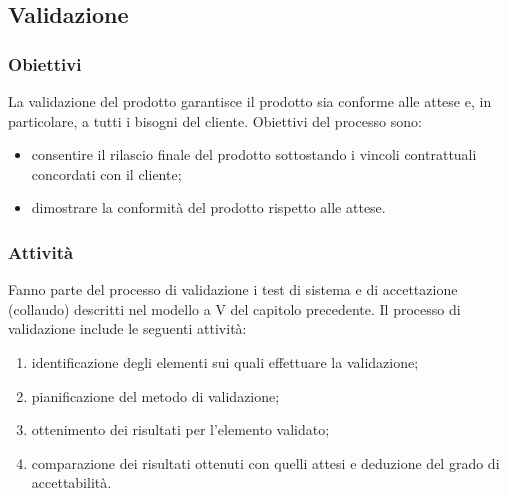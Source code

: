 \subsection{Validazione}
\subsubsection{Obiettivi}
La validazione del prodotto garantisce il prodotto sia conforme alle attese e, in particolare, a tutti i bisogni del cliente. Obiettivi del processo sono:
\begin{itemize}
	\item consentire il rilascio finale del prodotto sottostando i vincoli contrattuali concordati con il cliente;
	\item dimostrare la conformità del prodotto rispetto alle attese.
\end{itemize}

\subsubsection{Attività}
Fanno parte del processo di validazione i test di sistema e di accettazione (collaudo) descritti nel modello a V del capitolo precedente. 
Il processo di validazione include le seguenti attività:
\begin{enumerate}
	\item identificazione degli elementi sui quali effettuare la validazione;
	\item pianificazione del metodo di validazione;
	\item ottenimento dei risultati per l'elemento validato;
	\item comparazione dei risultati ottenuti con quelli attesi e deduzione del grado di accettabilità.
\end{enumerate}
